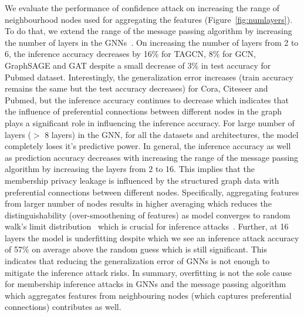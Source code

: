 We evaluate the performance of confidence attack on increasing the range of neighbourhood nodes used for aggregating the features (Figure~\ref{fig:numlayers}).
To do that, we extend the range of the message passing algorithm by increasing the number of layers in the GNNs~\cite{klicpera2018combining,Li2018DeeperII}.
On increasing the number of layers from 2 to 6, the inference accuracy decreases by 16\% for TAGCN, 8\% for GCN, GraphSAGE and GAT despite a small decrease of 3\% in test accuracy for Pubmed dataset.
Interestingly, the generalization error increases (train accuracy remains the same but the test accuracy decreases) for Cora, Citeseer and Pubmed, but the inference accuracy continues to decrease which indicates that the influence of preferential connections between different nodes in the graph plays a significant role in influencing the inference accuracy. %
For large number of layers ($>$ 8 layers) in the GNN, for all the datasets and architectures, the model completely loses it's predictive power.
In general, the inference accuracy as well as prediction accuracy decreases with increasing the range of the message passing algorithm by increasing the layers from 2 to 16.
This implies that the membership privacy leakage is influenced by the structured graph data with preferential connections between different nodes.
Specifically, aggregating features from larger number of nodes results in higher averaging which reduces the distinguishability (over-smoothening of features) as model converges to random walk’s limit distribution~\cite{klicpera2018combining,Li2018DeeperII} which is crucial for inference attacks~\cite{7958568,ndss19salem}.
Further, at 16 layers the model is underfitting despite which we see an inference attack accuracy of 57\% on average above the random guess which is still significant.
This indicates that reducing the generalization error of GNNs is not enough to mitigate the inference attack risks.
In summary, overfitting is not the sole cause for membership inference attacks in GNNs and the message passing algorithm which aggregates features from neighbouring nodes (which captures preferential connections) contributes as well.







